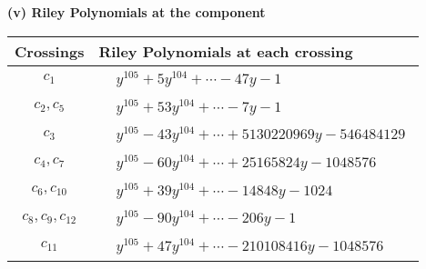 \documentclass[1p]{elsarticle_modified}
\theoremstyle{definition}
\begin{document}
\flushleft \textbf{(v) Riley Polynomials at the component}\newline \\
\begin{tabular}{m{50pt}|m{274pt}}
Crossings & \hspace{64pt}Riley Polynomials at each crossing \\
\hline $$\begin{aligned}c_{1}\end{aligned}$$&$\begin{aligned}
&y^{105}+5 y^{104}+\cdots-47 y-1
\end{aligned}$\\
\hline $$\begin{aligned}c_{2},c_{5}\end{aligned}$$&$\begin{aligned}
&y^{105}+53 y^{104}+\cdots-7 y-1
\end{aligned}$\\
\hline $$\begin{aligned}c_{3}\end{aligned}$$&$\begin{aligned}
&y^{105}-43 y^{104}+\cdots+5130220969 y-546484129
\end{aligned}$\\
\hline $$\begin{aligned}c_{4},c_{7}\end{aligned}$$&$\begin{aligned}
&y^{105}-60 y^{104}+\cdots+25165824 y-1048576
\end{aligned}$\\
\hline $$\begin{aligned}c_{6},c_{10}\end{aligned}$$&$\begin{aligned}
&y^{105}+39 y^{104}+\cdots-14848 y-1024
\end{aligned}$\\
\hline $$\begin{aligned}c_{8},c_{9},c_{12}\end{aligned}$$&$\begin{aligned}
&y^{105}-90 y^{104}+\cdots-206 y-1
\end{aligned}$\\
\hline $$\begin{aligned}c_{11}\end{aligned}$$&$\begin{aligned}
&y^{105}+47 y^{104}+\cdots-210108416 y-1048576
\end{aligned}$\\
\hline
\end{tabular}\\~\\
\end{document}
